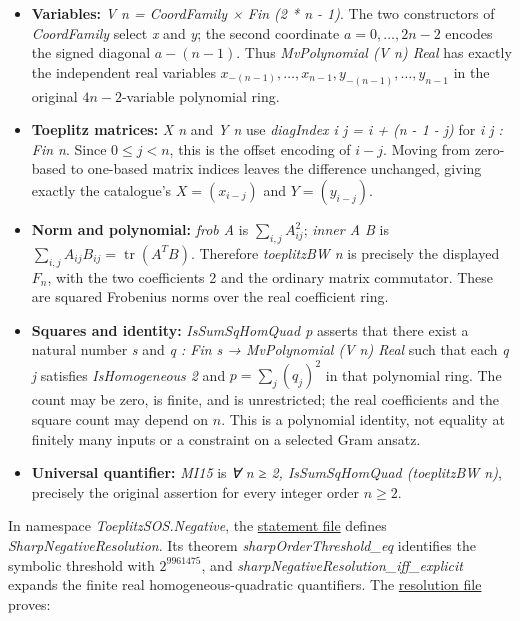 \documentclass[11pt,a4paper]{article}
\providecommand{\tightlist}{\setlength{\itemsep}{0pt}\setlength{\parskip}{0pt}}
\begin{document}
\begin{itemize}
\tightlist
\item
  \textbf{Variables:}
  \textit{V n = CoordFamily × Fin (2 * n - 1)}. The two
  constructors of \textit{CoordFamily} select \textit{x} and \textit{y};
  the second coordinate \(a=0,\ldots,2n-2\) encodes the signed diagonal
  \(a-(n-1)\). Thus \textit{MvPolynomial (V n) Real} has exactly the
  independent real variables
  \(x_{-(n-1)},\ldots,x_{n-1},y_{-(n-1)},\ldots,y_{n-1}\) in the
  original \(4n-2\)-variable polynomial ring.
\item
  \textbf{Toeplitz matrices:} \textit{X n} and \textit{Y n} use
  \textit{diagIndex i j = i + (n - 1 - j)} for
  \textit{i j : Fin n}. Since \(0\le j< n\), this is the offset
  encoding of \(i-j\). Moving from zero-based to one-based matrix
  indices leaves the difference unchanged, giving exactly the
  catalogue's \(X=(x_{i-j})\) and \(Y=(y_{i-j})\).
\item
  \textbf{Norm and polynomial:} \textit{frob A} is
  \(\sum_{i,j}A_{ij}^2\); \textit{inner A B} is
  \(\sum_{i,j}A_{ij}B_{ij}=\mathop{\mathrm{tr}}\nolimits(A^TB)\).
  Therefore \textit{toeplitzBW n} is precisely the displayed \(F_n\),
  with the two coefficients 2 and the ordinary matrix commutator. These
  are squared Frobenius norms over the real coefficient ring.
\item
  \textbf{Squares and identity:} \textit{IsSumSqHomQuad p} asserts that
  there exist a natural number \textit{s} and
  \textit{q : Fin s → MvPolynomial (V n) Real} such that each
  \textit{q j} satisfies \textit{IsHomogeneous 2} and
  \(p=\sum_j(q_j)^2\) in that polynomial ring. The count may be zero, is
  finite, and is unrestricted; the real coefficients and the square
  count may depend on \(n\). This is a polynomial identity, not equality
  at finitely many inputs or a constraint on a selected Gram ansatz.
\item
  \textbf{Universal quantifier:} \textit{MI15} is
  \textit{∀ n ≥ 2, IsSumSqHomQuad (toeplitzBW n)}, precisely the
  original assertion for every integer order \(n\ge2\).
\end{itemize}

In namespace \textit{ToeplitzSOS.Negative}, the
\href{https://github.com/erenup/toeplitz-bw-not-sos/blob/7126c0841b008dc89a21edfd008bbf1b748d280f/lean/ToeplitzSOS/Negative/SharpStatement.lean}{statement
file} defines \textit{SharpNegativeResolution}. Its theorem
\textit{sharpOrderThreshold\_eq} identifies the symbolic threshold with
\(2^{9961475}\), and \textit{sharpNegativeResolution\_iff\_explicit}
expands the finite real homogeneous-quadratic quantifiers. The
\href{https://github.com/erenup/toeplitz-bw-not-sos/blob/7126c0841b008dc89a21edfd008bbf1b748d280f/lean/ToeplitzSOS/Negative/Resolution.lean}{resolution
file} proves:
\end{document}
